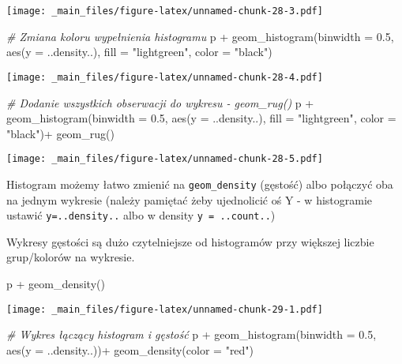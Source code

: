 \documentclass[
]{book}
\newenvironment{Shaded}{\begin{snugshade}}{\end{snugshade}}
\newcommand{\AttributeTok}[1]{\textcolor[rgb]{0.77,0.63,0.00}{#1}}
\newcommand{\CommentTok}[1]{\textcolor[rgb]{0.56,0.35,0.01}{\textit{#1}}}
\newcommand{\FloatTok}[1]{\textcolor[rgb]{0.00,0.00,0.81}{#1}}
\newcommand{\FunctionTok}[1]{\textcolor[rgb]{0.00,0.00,0.00}{#1}}
\newcommand{\NormalTok}[1]{#1}
\newcommand{\SpecialCharTok}[1]{\textcolor[rgb]{0.00,0.00,0.00}{#1}}
\newcommand{\StringTok}[1]{\textcolor[rgb]{0.31,0.60,0.02}{#1}}
\begin{document}
\texttt{[image: \_main\_files/figure-latex/unnamed-chunk-28-3.pdf]}

\begin{Shaded}
\begin{Highlighting}[]
\CommentTok{\# Zmiana koloru wypełnienia histogramu}
\NormalTok{p }\SpecialCharTok{+} \FunctionTok{geom\_histogram}\NormalTok{(}\AttributeTok{binwidth =} \FloatTok{0.5}\NormalTok{, }\FunctionTok{aes}\NormalTok{(}\AttributeTok{y =}\NormalTok{ ..density..), }
                   \AttributeTok{fill =} \StringTok{"lightgreen"}\NormalTok{, }\AttributeTok{color =} \StringTok{"black"}\NormalTok{)}
\end{Highlighting}
\end{Shaded}

\texttt{[image: \_main\_files/figure-latex/unnamed-chunk-28-4.pdf]}

\begin{Shaded}
\begin{Highlighting}[]
\CommentTok{\# Dodanie wszystkich obserwacji do wykresu {-} geom\_rug()}
\NormalTok{p }\SpecialCharTok{+} \FunctionTok{geom\_histogram}\NormalTok{(}\AttributeTok{binwidth =} \FloatTok{0.5}\NormalTok{, }\FunctionTok{aes}\NormalTok{(}\AttributeTok{y =}\NormalTok{ ..density..), }
                   \AttributeTok{fill =} \StringTok{"lightgreen"}\NormalTok{, }\AttributeTok{color =} \StringTok{"black"}\NormalTok{)}\SpecialCharTok{+}
  \FunctionTok{geom\_rug}\NormalTok{()}
\end{Highlighting}
\end{Shaded}

\texttt{[image: \_main\_files/figure-latex/unnamed-chunk-28-5.pdf]}

Histogram możemy łatwo zmienić na \texttt{geom\_density} (gęstość) albo połączyć oba na jednym wykresie (należy pamiętać żeby ujednolicić oś Y - w histogramie ustawić \texttt{y=..density..} albo w density \texttt{y\ =\ ..count..})

Wykresy gęstości są dużo czytelniejsze od histogramów przy większej liczbie grup/kolorów na wykresie.

\begin{Shaded}
\begin{Highlighting}[]
\NormalTok{p }\SpecialCharTok{+} \FunctionTok{geom\_density}\NormalTok{()}
\end{Highlighting}
\end{Shaded}

\texttt{[image: \_main\_files/figure-latex/unnamed-chunk-29-1.pdf]}

\begin{Shaded}
\begin{Highlighting}[]
\CommentTok{\# Wykres łączący histogram i gęstość}
\NormalTok{p }\SpecialCharTok{+} \FunctionTok{geom\_histogram}\NormalTok{(}\AttributeTok{binwidth =} \FloatTok{0.5}\NormalTok{, }\FunctionTok{aes}\NormalTok{(}\AttributeTok{y =}\NormalTok{ ..density..))}\SpecialCharTok{+}
  \FunctionTok{geom\_density}\NormalTok{(}\AttributeTok{color =} \StringTok{"red"}\NormalTok{)}
\end{Highlighting}
\end{Shaded}
\end{document}
